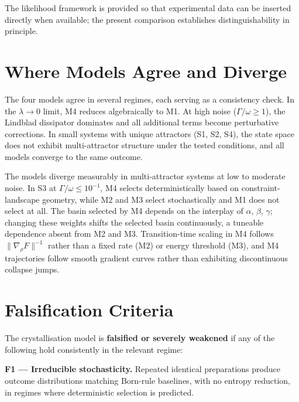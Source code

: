 \documentclass[12pt]{article}
\begin{document}
The likelihood framework is provided so that experimental data can be inserted directly when available; the present comparison establishes distinguishability in principle.

\section{Where Models Agree and Diverge}
\label{sec:agreement}

The four models agree in several regimes, each serving as a consistency check. In the $\lambda \to 0$ limit, M4 reduces algebraically to M1. At high noise ($\Gamma/\omega \geq 1$), the Lindblad dissipator dominates and all additional terms become perturbative corrections. In small systems with unique attractors (S1, S2, S4), the state space does not exhibit multi-attractor structure under the tested conditions, and all models converge to the same outcome.

The models diverge measurably in multi-attractor systems at low to moderate noise. In S3 at $\Gamma/\omega \leq 10^{-1}$, M4 selects deterministically based on constraint-landscape geometry, while M2 and M3 select stochastically and M1 does not select at all. The basin selected by M4 depends on the interplay of $\alpha$, $\beta$, $\gamma$; changing these weights shifts the selected basin continuously, a tuneable dependence absent from M2 and M3. Transition-time scaling in M4 follows $\|\nabla_\rho F\|^{-1}$ rather than a fixed rate (M2) or energy threshold (M3), and M4 trajectories follow smooth gradient curves rather than exhibiting discontinuous collapse jumps.

\section{Falsification Criteria}
\label{sec:falsification}

The crystallisation model is \textbf{falsified or severely weakened} if any of the following hold consistently in the relevant regime:

\textbf{F1 --- Irreducible stochasticity.} Repeated identical preparations produce outcome distributions matching Born-rule baselines, with no entropy reduction, in regimes where deterministic selection is predicted.
\end{document}
